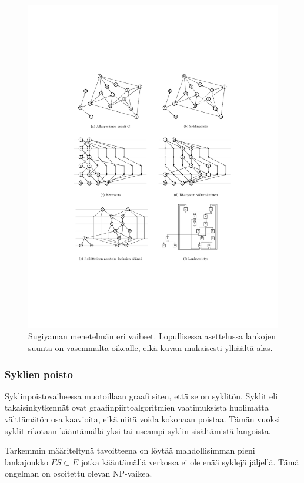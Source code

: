 \documentclass[finnish,12pt]{article}
\begin{document}
\newpage
\begin{figure}[!p]
\centering
\includegraphics[width=\textwidth]{hier.pdf}
\caption{Sugiyaman menetelmän eri vaiheet. Lopullisessa asettelussa lankojen suunta on vasemmalta oikealle, eikä kuvan mukaisesti ylhäältä alas.}
\end{figure}

		\subsubsection{Syklien poisto}

Syklinpoistovaiheessa muotoillaan graafi siten, että se on syklitön.
Syklit eli takaisinkytkennät ovat graafinpiirtoalgoritmien vaatimuksista huolimatta välttämätön osa kaavioita, eikä niitä voida kokonaan poistaa.
Tämän vuoksi syklit rikotaan kääntämällä yksi tai useampi syklin sisältämistä langoista.

Tarkemmin määriteltynä tavoitteena on löytää mahdollisimman pieni lankajoukko $FS \subset E $ jotka kääntämällä verkossa ei ole enää syklejä jäljellä.
Tämä ongelman on osoitettu olevan NP-vaikea. \cite{RefWorks:65}
\end{document}
